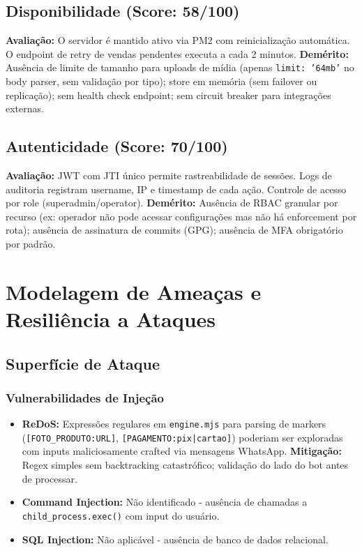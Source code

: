 \documentclass[11pt, a4paper]{article}
\begin{document}
\subsection{Disponibilidade (Score: 58/100)}

\textbf{Avaliação:} O servidor é mantido ativo via PM2 com reinicialização automática. O endpoint de retry de vendas pendentes executa a cada 2 minutos. \textbf{Demérito:} Ausência de limite de tamanho para uploads de mídia (apenas \texttt{limit: '64mb'} no body parser, sem validação por tipo); store em memória (sem failover ou replicação); sem health check endpoint; sem circuit breaker para integrações externas.

\subsection{Autenticidade (Score: 70/100)}

\textbf{Avaliação:} JWT com JTI único permite rastreabilidade de sessões. Logs de auditoria registram username, IP e timestamp de cada ação. Controle de acesso por role (superadmin/operator). \textbf{Demérito:} Ausência de RBAC granular por recurso (ex: operador não pode acessar configurações mas não há enforcement por rota); ausência de assinatura de commits (GPG); ausência de MFA obrigatório por padrão.

\section{Modelagem de Ameaças e Resiliência a Ataques}

\subsection{Superfície de Ataque}

\subsubsection{Vulnerabilidades de Injeção}
\begin{itemize}
  \item \textbf{ReDoS:} Expressões regulares em \texttt{engine.mjs} para parsing de markers (\texttt{[FOTO\_PRODUTO:URL]}, \texttt{[PAGAMENTO:pix|cartao]}) poderiam ser exploradas com inputs maliciosamente crafted via mensagens WhatsApp. \textbf{Mitigação:} Regex simples sem backtracking catastrófico; validação do lado do bot antes de processar.
  \item \textbf{Command Injection:} Não identificado - ausência de chamadas a \texttt{child\_process.exec()} com input do usuário.
  \item \textbf{SQL Injection:} Não aplicável - ausência de banco de dados relacional.
\end{itemize}
\end{document}
